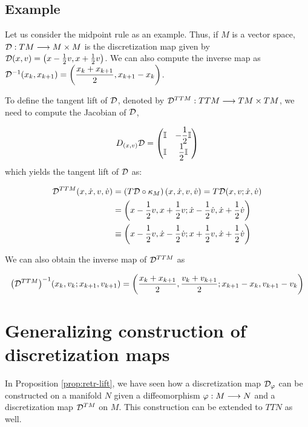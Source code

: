\subsection{Example}

Let us consider the midpoint rule as an example. Thus, if $M$ is a vector space, $\mathcal{D} : TM \longrightarrow M \times M$ is the discretization map given by $\mathcal{D}(x,v) = \left( x - \frac{1}{2}v, x + \frac{1}{2}v \right)$. We can also compute the inverse map as $\mathcal{D}^{-1}(x_k, x_{k+1}) = \left(\dfrac{x_k + x_{k+1}}{2}, x_{k+1} - x_k \right)$.

\newpage

To define the tangent lift of $\mathcal{D}$, denoted by $\mathcal{D}^{TTM}: TTM \longrightarrow TM \times TM$, we need to compute the Jacobian of $\mathcal{D}$,

\[
  D_{(x,v)} \mathcal{D} = \begin{pmatrix}\mathbb{I} & -\dfrac{1}{2} \mathbb{I} \\ \mathbb{I} & \dfrac{1}{2} \mathbb{I}\end{pmatrix}
\]
which yields the tangent lift of $\mathcal{D}$ as:

\begin{equation*}
  \begin{split}
    \mathcal{D}^{TTM} (x, \dot{x}, v, \dot{v}) &= (T\mathcal{D} \circ \kappa_M)\left( x, \dot{x}, v, \dot{v} \right) = T\mathcal{D}(x, v ; \dot{x}, \dot{v}) \\
    &= \left( x - \dfrac{1}{2}v, x + \dfrac{1}{2}v ; \dot{x} - \dfrac{1}{2}\dot{v}, \dot{x} + \dfrac{1}{2} \dot{v} \right) \\
    & \equiv \left( x - \dfrac{1}{2}v, \dot{x} - \dfrac{1}{2}\dot{v} ; x + \dfrac{1}{2}v, \dot{x} + \dfrac{1}{2} \dot{v} \right)
  \end{split}
\end{equation*}

We can also obtain the inverse map of $\mathcal{D}^{TTM}$ as 

\[ {\left(\mathcal{D}^{TTM}\right)}^{-1} (x_k, v_k; x_{k+1}, v_{k+1}) = \left( \dfrac{x_k + x_{k+1}}{2}, \dfrac{v_k + v_{k+1}}{2}; x_{k+1} - x_k, v_{k+1} - v_k \right) \]

\section{Generalizing construction of discretization maps}

In Proposition \ref{prop:retr-lift}, we have seen how a discretization map $\mathcal{D}_{\varphi}$ can be constructed on a manifold $N$ given a diffeomorphism $\varphi: M \longrightarrow N$ and a discretization map $\mathcal{D}^{TM}$ on $M$. This construction can be extended to $TTN$ as well.

